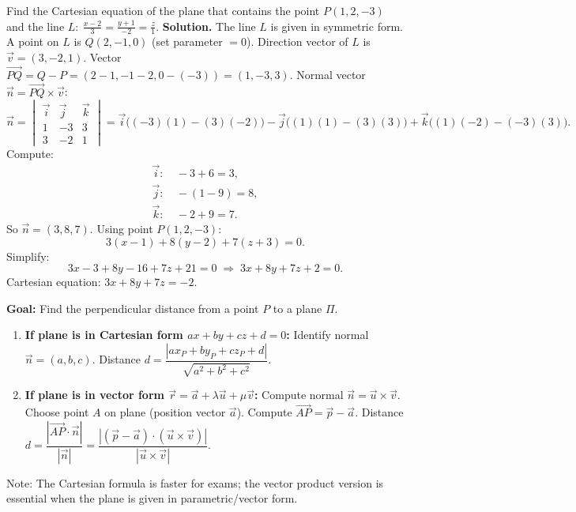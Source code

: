 \documentclass[11pt]{article}
\newcommand{\cle}[1]{{\popxbold\color{popdark}#1}}
\begin{document}
\begin{exoresolu}
Find the Cartesian equation of the plane that contains the point $P(1,2,-3)$ and the line $L:\ \frac{x-2}{3}=\frac{y+1}{-2}=\frac{z}{1}$.
\tcblower
\textbf{Solution.}
The line $L$ is given in symmetric form. A point on $L$ is $Q(2,-1,0)$ (set parameter $=0$). Direction vector of $L$ is $\vec{v}=(3,-2,1)$.
Vector $\overrightarrow{PQ}=Q-P=(2-1,-1-2,0-(-3))=(1,-3,3)$.
Normal vector $\vec{n}=\overrightarrow{PQ}\times\vec{v}$:
\[
\vec{n}=
\begin{vmatrix}
\vec{i} & \vec{j} & \vec{k} \\
1 & -3 & 3 \\
3 & -2 & 1
\end{vmatrix}
=\vec{i}\bigl((-3)(1)-(3)(-2)\bigr)-\vec{j}\bigl((1)(1)-(3)(3)\bigr)+\vec{k}\bigl((1)(-2)-(-3)(3)\bigr).
\]
Compute:
\begin{align*}
\vec{i}:&\ -3+6=3,\\
\vec{j}:&\ -(1-9)=8,\\
\vec{k}:&\ -2+9=7.
\end{align*}
So $\vec{n}=(3,8,7)$.
Using point $P(1,2,-3)$:
\[
3(x-1)+8(y-2)+7(z+3)=0.
\]
Simplify:
\[
3x-3+8y-16+7z+21=0\;\Longrightarrow\;3x+8y+7z+2=0.
\]
Cartesian equation: $\boxed{3x+8y+7z=-2}$.
\end{exoresolu}

\begin{methode}
\textbf{Goal:} Find the perpendicular distance from a point $P$ to a plane $\Pi$.
\begin{enumerate}
\item \textbf{If plane is in Cartesian form $ax+by+cz+d=0$:}
Identify normal $\vec{n}=(a,b,c)$. Distance $d=\dfrac{|ax_P+by_P+cz_P+d|}{\sqrt{a^2+b^2+c^2}}$.
\item \textbf{If plane is in vector form $\vec{r}=\vec{a}+\lambda\vec{u}+\mu\vec{v}$:}
Compute normal $\vec{n}=\vec{u}\times\vec{v}$.
Choose point $A$ on plane (position vector $\vec{a}$).
Compute $\overrightarrow{AP}=\vec{p}-\vec{a}$.
Distance $d=\dfrac{|\overrightarrow{AP}\cdot\vec{n}|}{|\vec{n}|}=\dfrac{|(\vec{p}-\vec{a})\cdot(\vec{u}\times\vec{v})|}{|\vec{u}\times\vec{v}|}$.
\end{enumerate}
\cle{Note:} The Cartesian formula is faster for exams; the vector product version is essential when the plane is given in parametric/vector form.
\end{methode}
\end{document}
